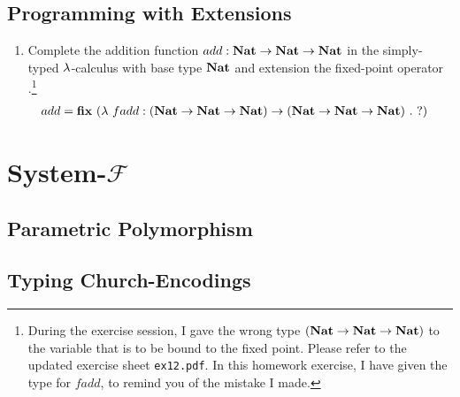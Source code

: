 \documentclass[a4paper,12pt]{article}
\begin{document}
\subsection{Programming with Extensions}

\begin{enumerate}
 \item Complete the addition function $add : \textbf{Nat} \rightarrow \textbf{Nat} \rightarrow \textbf{Nat}$ in the simply-typed
  $\lambda$-calculus with base type $\textbf{Nat}$ and extension the fixed-point operator \fixp.\footnote{During
  the exercise session, I gave the wrong type $(\textbf{Nat} \rightarrow \textbf{Nat} \rightarrow \textbf{Nat})$ to the variable that is
  to be bound to the fixed point.  Please refer to the updated exercise sheet \texttt{ex12.pdf}.  In this
  homework exercise, I have given the type for $fadd$, to remind you of the mistake I made.}
  \begin{align*}
   add = \textbf{fix}\ (& \lambda\ fadd : (\textbf{Nat} \rightarrow \textbf{Nat} \rightarrow \textbf{Nat}) \rightarrow (\textbf{Nat} \rightarrow \textbf{Nat} \rightarrow \textbf{Nat})\ .\ ?)
  \end{align*}
\end{enumerate}

\section{System-$\mathcal{F}$}

\subsection{Parametric Polymorphism}

\subsection{Typing Church-Encodings}
\end{document}
